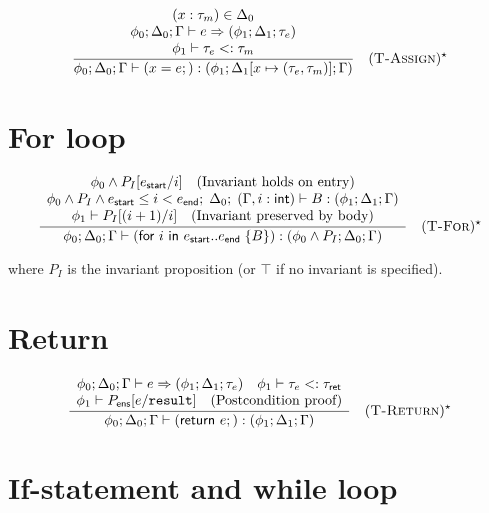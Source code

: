 $$
  \frac{
    \begin{array}{c}
      (x: \tau_m) \in \Delta_0                                                 \\
      \phi_0; \Delta_0; \Gamma \vdash e \Rightarrow (\phi_1; \Delta_1; \tau_e) \\
      \phi_1 \vdash \tau_e <: \tau_m
    \end{array}
  }{
    \phi_0; \Delta_0; \Gamma \vdash (x = e;) : (\phi_1; \Delta_1[x \mapsto (\tau_e, \tau_m)]; \Gamma)
  } \quad (\textsc{T-Assign})^\star
$$

\section*{For loop}

$$
  \frac{
    \begin{array}{c}
      \phi_0 \wedge P_I[e_\textsf{start}/i] \quad \text{(Invariant holds on entry)}                                                                   \\
      \phi_0 \wedge P_I \wedge e_\textsf{start} \le i < e_\textsf{end};\; \Delta_0;\; (\Gamma, i: \textsf{int}) \vdash B : (\phi_1; \Delta_1; \Gamma) \\
      \phi_1 \vdash P_I[(i+1)/i] \quad \text{(Invariant preserved by body)}
    \end{array}
  }{
    \phi_0; \Delta_0; \Gamma \vdash (\textsf{for } i \textsf{ in } e_\textsf{start}..e_\textsf{end}\;\{B\}) : (\phi_0 \wedge P_I; \Delta_0; \Gamma)
  } \quad (\textsc{T-For})^\star
$$

\noindent where $P_I$ is the invariant proposition (or $\top$ if no invariant is specified).

\section*{Return}

$$
  \frac{
    \begin{array}{c}
      \phi_0; \Delta_0; \Gamma \vdash e \Rightarrow (\phi_1; \Delta_1; \tau_e) \quad \phi_1 \vdash \tau_e <: \tau_\textsf{ret} \\
      \phi_1 \vdash P_\textsf{ens}[e/\mathtt{result}] \quad \text{(Postcondition proof)}
    \end{array}
  }{
    \phi_0; \Delta_0; \Gamma \vdash (\textsf{return } e;) : (\phi_1; \Delta_1; \Gamma)
  } \quad (\textsc{T-Return})^\star
$$

\section*{If-statement and while loop}

